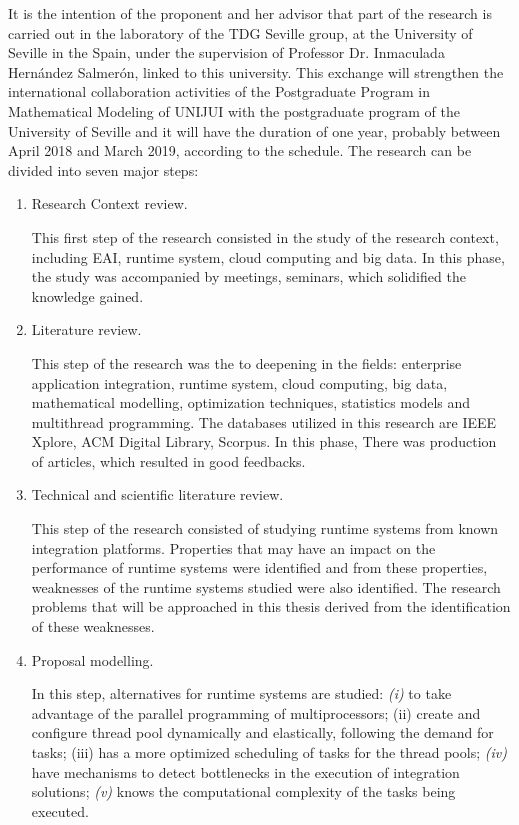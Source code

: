 It is the intention of the proponent and her advisor that part of the research is carried out in the laboratory of the TDG Seville group, at the University of Seville in the Spain, under the supervision of Professor Dr. Inmaculada Hernández Salmerón, linked to this university. This exchange will strengthen the international collaboration activities of the Postgraduate Program in Mathematical Modeling of UNIJUI with the postgraduate program of the University of Seville and it will have the duration of one year, probably between April 2018 and March 2019, according to the schedule.
\clearpage
The research can be divided into seven major steps:
\begin{enumerate}
\item Research Context review. 

This first step of the research consisted in the study of the research context, including EAI, runtime system, cloud computing and big data. In this phase, the study was accompanied by meetings, seminars, which solidified the knowledge gained.
\item Literature review. 

This step of the research was the to deepening in the fields: enterprise application integration, runtime system, cloud computing, big data, mathematical modelling, optimization techniques, statistics models and multithread programming. The databases utilized in this research are IEEE Xplore, ACM Digital Library, Scorpus. In this phase, There was production of articles, which resulted in good feedbacks.
\item Technical and scientific literature review.

This step of the research consisted of studying runtime systems from known integration platforms. Properties that may have an impact on the performance of runtime systems were identified and from these properties, weaknesses of the runtime systems studied were also identified. The research problems that will be approached in this thesis derived from the identification of these weaknesses.
\item Proposal modelling.

In this step, alternatives for runtime systems are studied: \textit{(i)} to take advantage of the parallel programming of multiprocessors; (ii) create and configure thread pool dynamically and elastically, following the demand for tasks; (iii) has a more optimized scheduling of tasks for the thread pools; \textit{(iv)} have mechanisms to detect bottlenecks in the execution of integration solutions; \textit{(v)} knows the computational complexity of the tasks being executed.


\end{enumerate}
